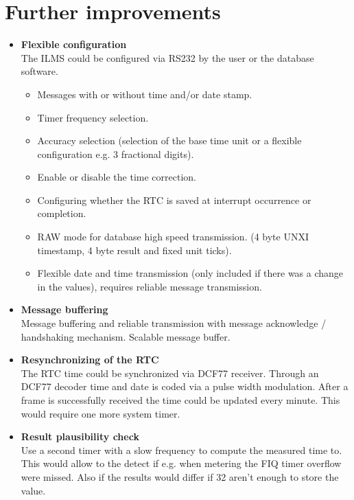 \section{Further improvements}
\label{improv}
\begin{itemize}
	
	\item \textbf{Flexible configuration}\\
				The \ac{ILMS} could be configured via RS232 by the user or the database software.
				\begin{itemize}
						\item Messages with or without time and/or date stamp.
						\item Timer frequency selection.
						\item Accuracy selection (selection of the base time unit or a flexible configuration e.g. 3 fractional digits).
						\item Enable or disable the time correction.
						\item Configuring whether the \ac{RTC} is saved at interrupt occurrence or completion.
						\item RAW mode for database high speed transmission. (4 byte UNXI timestamp, 4 byte result and fixed unit ticks).
						\item Flexible date and time transmission (only included if there was a change in the values), 					requires reliable message transmission.
				\end{itemize}
	
	\item \textbf{Message buffering}\\
				 Message buffering and reliable transmission with message acknowledge / handshaking mechanism. Scalable message buffer.
	
	\item \textbf{Resynchronizing of the RTC}\\
				The \ac{RTC} time could be synchronized via DCF77 receiver. Through an DCF77 decoder time and date is coded via a pulse width modulation. After a frame is successfully received the time could be updated every minute. This would require one more system timer. 
	\item \textbf{Result plausibility  check}\\
				Use a second timer with a slow frequency to compute the measured time to. This would allow to the detect if e.g. when metering the \ac{FIQ} timer overflow were missed. Also if the results would differ if 32 aren't enough to store the value.
	

\end{itemize}
